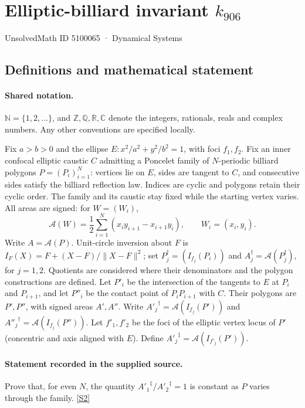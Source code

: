 \documentclass[11pt]{article}
\newcommand{\sref}[2]{\hyperlink{source:#1:#2}{[S#2]}}
\begin{document}
\setcounter{section}{5100064}
\section{Elliptic-billiard invariant $k_{906}$}\label{5100065}
{\small\sffamily UnsolvedMath ID 5100065 · Dynamical Systems}
\subsection{Definitions and mathematical statement}

\paragraph{Shared notation.}$\mathbb N=\{1,2,\ldots\}$, and $\mathbb Z,\mathbb Q,\mathbb R,\mathbb C$ denote the integers, rationals, reals and complex numbers. Any other conventions are specified locally.


Fix $a>b>0$ and the ellipse $E:x^2/a^2+y^2/b^2=1$, with foci $f_1,f_2$. Fix an inner confocal elliptic caustic $C$ admitting a Poncelet family of $N$-periodic billiard polygons $P=(P_i)_{i=1}^N$: vertices lie on $E$, sides are tangent to $C$, and consecutive sides satisfy the billiard reflection law. Indices are cyclic and polygons retain their cyclic order. The family and its caustic stay fixed while the starting vertex varies. All areas are signed: for $W=(W_i)$,
\[\mathcal A(W)=\frac12\sum_{i=1}^N(x_i y_{i+1}-x_{i+1}y_i),\qquad W_i=(x_i,y_i).\]
Write $A=\mathcal A(P)$. Unit-circle inversion about $F$ is $I_F(X)=F+(X-F)/\lVert X-F\rVert^2$; set $P_j^\dagger=(I_{f_j}(P_i))$ and $A_j^\dagger=\mathcal A(P_j^\dagger)$, for $j=1,2$. Quotients are considered where their denominators and the polygon constructions are defined. Let $P'_i$ be the intersection of the tangents to $E$ at $P_i$ and $P_{i+1}$, and let $P''_i$ be the contact point of $P_iP_{i+1}$ with $C$. Their polygons are $P',P''$, with signed areas $A',A''$. Write ${A'_j}^\dagger=\mathcal A(I_{f_j}(P'))$ and ${A''_j}^\dagger=\mathcal A(I_{f_j}(P''))$. Let $f'_1,f'_2$ be the foci of the elliptic vertex locus of $P'$ (concentric and axis aligned with $E$). Define ${A'_j}^{\ddagger}=\mathcal A(I_{f'_j}(P'))$.
\paragraph{Statement recorded in the supplied source.}
Prove that, for even $N$, the quantity ${A'_1}^\ddagger/{A'_2}^\ddagger=1$ is constant as $P$ varies through the family. \sref{5100065}{2}
\end{document}
